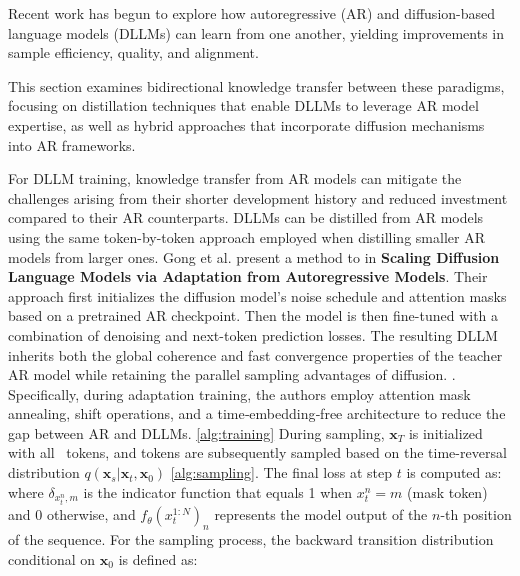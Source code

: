 Recent work has begun to explore how autoregressive (AR) and diffusion-based language models (DLLMs) can learn from one another, yielding improvements in sample efficiency, quality, and alignment.  

This section examines bidirectional knowledge transfer between these paradigms, focusing on distillation techniques that enable DLLMs to leverage AR model expertise, as well as hybrid approaches that incorporate diffusion mechanisms into AR frameworks.


For DLLM training, knowledge transfer from AR models can mitigate the challenges arising from their shorter development history and reduced investment compared to their AR counterparts. %
DLLMs can be distilled from AR models using the same token-by-token approach employed when distilling smaller AR models from larger ones. %
Gong et al. present a method to in \textbf{Scaling Diffusion Language Models via Adaptation from Autoregressive Models}. Their approach first initializes the diffusion model's noise schedule and attention masks based on a pretrained AR checkpoint. Then the model is then fine-tuned with a combination of denoising and next-token prediction losses. The resulting DLLM inherits both the global coherence and fast convergence properties of the teacher AR model while retaining the parallel sampling advantages of diffusion. \cite{gong_scaling_2025}. %
Specifically, during adaptation training, the authors employ attention mask annealing, shift operations, and a time‑embedding‑free architecture to reduce the gap between AR and DLLMs. \ref{alg:training} %
During sampling, $\bm{x}_T$ is initialized with all \mask ~tokens, and tokens are subsequently sampled based on the time-reversal distribution $q(\bm{x}_s|\bm{x}_t, \bm{x}_0)$ \ref{alg:sampling}. The final loss at step $t$ is computed as:
%
where $\delta_{x_t^n, m}$ is the indicator function that equals 1 when $x_t^n = m$ (mask token) and 0 otherwise, and $f_\theta(x_t^{1:N})_n$ represents the model output of the $n$-th position of the sequence. For the sampling process, the backward transition distribution conditional on $\bm{x}_0$ is defined as: 


